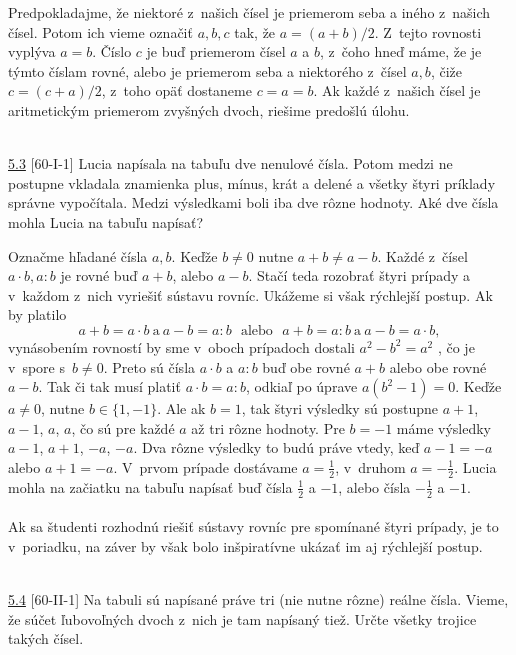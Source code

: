 \rieh Predpokladajme, že niektoré z~našich čísel je priemerom seba a iného z~našich čísel. Potom ich vieme označiť $a, b, c$ tak, že $a = (a + b)/2$. Z~tejto rovnosti vyplýva $a = b$. Číslo $c$ je buď priemerom čísel $a$ a $b$, z~čoho hneď máme, že je týmto číslam rovné, alebo je priemerom seba a niektorého z~čísel $a, b$, čiže $c = (c + a)/2$, z~toho opäť dostaneme $c = a = b$. Ak každé z~našich čísel je aritmetickým priemerom zvyšných dvoch, riešime predošlú úlohu.\\
\\
\begin{tcolorbox}[breakable,notitle,boxrule=0pt,colback=light-gray,colframe=light-gray]\ul{5.3} [60-I-1]
Lucia napísala na tabuľu dve nenulové čísla. Potom medzi ne postupne vkladala znamienka plus, mínus, krát a delené a všetky štyri príklady správne vypočítala. Medzi výsledkami boli iba dve rôzne hodnoty. Aké dve čísla mohla Lucia na tabuľu napísať?

\end{tcolorbox}

\rieh Označme hľadané čísla $a, b$. Keďže $b \neq 0$ nutne $a + b \neq a - b$. Každé z~čísel $a \cdot b, a : b$ je rovné buď $a + b$, alebo $a - b$. Stačí teda rozobrať štyri prípady a v~každom z~nich vyriešiť sústavu rovníc. Ukážeme si však rýchlejší postup.
Ak by platilo
$$ a + b = a \cdot b \ \mathrm{a} \ a - b = a : b \ \ \  \mathrm{alebo} \ \ \  a + b = a : b \ \mathrm{a} \ a - b = a \cdot b,$$
vynásobením rovností by sme v~oboch prípadoch dostali $a^2 - b^2 = a^2$ , čo je v~spore s~$b\neq 0$. Preto sú čísla $a \cdot b$ a $a : b$ buď obe rovné $a + b$ alebo obe rovné $a - b$. Tak či tak musí platiť $a \cdot b = a : b$, odkiaľ po úprave $a(b^2 - 1) = 0$. Keďže $a\neq 0$, nutne $b \in \{ 1, - 1 \}$. Ale ak $b = 1$, tak štyri výsledky sú postupne $a + 1$, $a - 1$, $a$, $a$, čo sú pre každé $a$ až tri rôzne hodnoty. Pre $b = - 1$ máme výsledky $a - 1$, $a + 1$, $- a$, $- a$. Dva rôzne výsledky to budú práve vtedy, keď $a - 1 = - a$ alebo $a + 1 = - a$. V~prvom prípade dostávame $a =\frac{1}{2}$, v~druhom $a = - \frac{1}{2}$.
Lucia mohla na začiatku na tabuľu napísať buď čísla $\frac{1}{2}$ a $- 1$, alebo čísla $-\frac{1}{2}$ a $- 1$.\\
\\
\kom Ak sa študenti rozhodnú riešiť sústavy rovníc pre spomínané štyri prípady, je to v~poriadku, na záver by však bolo inšpiratívne ukázať im aj rýchlejší postup.\\
\\
\begin{tcolorbox}[breakable,notitle,boxrule=0pt,colback=light-gray,colframe=light-gray]\ul{5.4} [60-II-1]
Na tabuli sú napísané práve tri (nie nutne rôzne) reálne čísla. Vieme, že súčet ľubovoľných dvoch z~nich je tam napísaný tiež. Určte všetky trojice takých čísel.

\end{tcolorbox}

